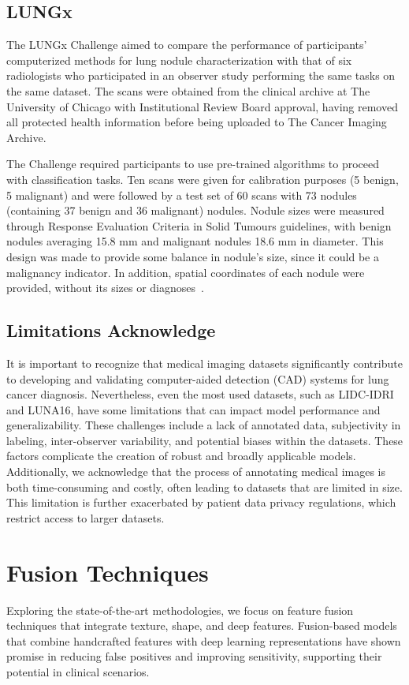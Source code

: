 \subsection{LUNGx}\label{lungx}
The LUNGx Challenge aimed to compare the performance of participants’ computerized methods for lung nodule characterization with that of six radiologists who participated in an observer study performing the same tasks on the same dataset. The scans were obtained from the clinical archive at The University of Chicago with Institutional Review Board approval, having removed all protected health information before being uploaded to The Cancer Imaging Archive. %

The Challenge required participants to use pre-trained algorithms to proceed with classification tasks. Ten scans were given for calibration purposes (5 benign, 5 malignant) and were followed by a test set of 60 scans with 73 nodules (containing 37 benign and 36 malignant) nodules. 
Nodule sizes were measured through Response Evaluation Criteria in Solid Tumours guidelines, with benign nodules averaging 15.8 mm and malignant nodules 18.6 mm in diameter. This design was made to provide some balance in nodule's size, since it could be a malignancy indicator. In addition, spatial coordinates of each nodule were provided, without its sizes or diagnoses~\cite{LUNGx}.

\subsection{Limitations Acknowledge}

It is important to recognize that medical imaging datasets significantly contribute to developing and validating computer-aided detection (CAD) systems for lung cancer diagnosis. Nevertheless, even the most used datasets, such as LIDC-IDRI and LUNA16, have some limitations that can impact model performance and generalizability. These challenges include a lack of annotated data, subjectivity in labeling, inter-observer variability, and potential biases within the datasets. These factors complicate the creation of robust and broadly applicable models. Additionally, we acknowledge that the process of annotating medical images is both time-consuming and costly, often leading to datasets that are limited in size. This limitation is further exacerbated by patient data privacy regulations, which restrict access to larger datasets.~\cite{Gu2021}

\section{Fusion Techniques}
Exploring the state-of-the-art methodologies, we focus on feature fusion techniques that integrate texture, shape, and deep features. Fusion-based models~\cite{Liu2023, Xie2018} that combine handcrafted features with deep learning representations have shown promise in reducing false positives and improving sensitivity, supporting their potential in clinical scenarios.

